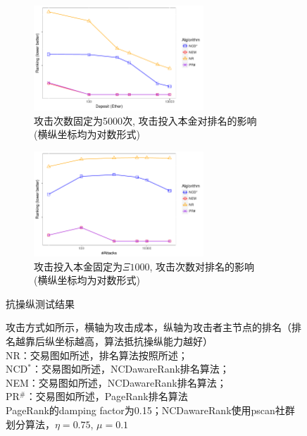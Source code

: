 \begin{figure}[!ht]
	\centering
	\begin{subfigure}{\linewidth}
		\centering
		\includegraphics[width=0.7\textwidth]{figs/AttackDeposit.pdf}
		\caption{攻击次数固定为5000次, 攻击投入本金对排名的影响 \\ \footnotesize{(横纵坐标均为对数形式)}}
		\label{subfig:deposit}
	\end{subfigure}

	\begin{subfigure}{\linewidth}
	    \centering
		\includegraphics[width=0.7\textwidth]{figs/AttackTimes.pdf}
		\caption{攻击投入本金固定为$\Xi1000$, 攻击次数对排名的影响  \\ \footnotesize{(横纵坐标均为对数形式)}}\label{subfig:times}
	\end{subfigure}

	\caption{抗操纵测试结果} \label{fig:antiManipulation}
	\caption*{\footnotesize{攻击方式如所示，横轴为攻击成本，纵轴为攻击者主节点的排名（排名越靠后纵坐标越高，算法抵抗操纵能力越好） \\
	NR：交易图如所述，排名算法按照所述；
	\\ NCD$^*$：交易图如所述，NCDawareRank排名算法；\\ NEM：交易图如\cite{nem}所述，NCDawareRank排名算法；\\ PR$^{\#}$：交易图如\cite{nem}所述，PageRank排名算法 \\ PageRank的damping factor为0.15；NCDawareRank使用pscan\cite{chang2017mathsf}社群划分算法，$\eta=0.75$, $\mu=0.1$}}
\end{figure}

